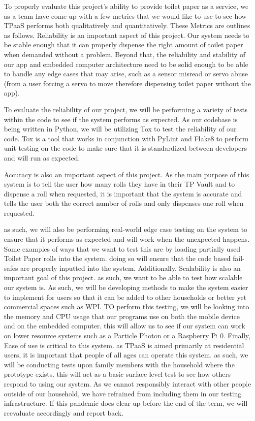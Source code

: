 To properly evaluate this project's ability to provide toilet paper as a service, we as a team have come up with a few metrics that we would like to use to see how TPaaS performs both qualitatively and quantitatively. These Metrics are outlines as follows.
Reliability is an important aspect of this project. Our system needs to be stable enough that it can properly dispense the right amount of toilet paper when demanded without a problem. Beyond that, the reliability and stability of our app and embedded computer architecture need to be solid enough to be able to handle any edge cases that may arise, such as a sensor misread or servo abuse (from a user forcing a servo to move therefore dispensing toilet paper without the app).

To evaluate the reliability of our project, we will be performing a variety of tests within the code to see if the system performs as expected. As our codebase is being written in Python\cite{python}, we will be utilizing Tox\cite{tox} to test the reliability of our code. Tox is a tool that works in conjunction with PyLint\cite{pylint} and Flake8\cite{flake8} to perform unit testing on the code to make sure that it is standardized between developers and will run as expected. 

Accuracy is also an important aspect of this project. As the main purpose of this system is to tell the user how many rolls they have in their TP Vault and to dispense a roll when requested, it is important that the system is accurate and tells the user both the correct number of rolls and only dispenses one roll when requested.

as such, we will also be performing real-world edge case testing on the system to ensure that it performs as expected and will work when the unexpected happens. Some examples of ways that we want to test this are by loading partially used Toilet Paper rolls into the system. doing so will ensure that the code based fail-safes are properly inputted into the system. 
Additionally, Scalability is also an important goal of this project. as such, we want to be able to test how scalable our system is. As such, we will be developing methods to make the system easier to implement for users so that it can be added to other households or better yet commercial spaces such as WPI. 
TO perform this testing, we will be looking into the memory and CPU usage that our programs use on both the mobile device and on the embedded computer. this will allow us to see if our system can work on lower resource systems such as a Particle Photon or a Raspberry Pi 0.
Finally, Ease of use is critical to this system. as TPaaS is aimed primarily at residential users, it is important that people of all ages can operate this system. as such, we will be conducting tests upon family members with the household where the prototype exists. this will act as a basic surface level test to see how others respond to using our system. As we cannot responsibly interact with other people outside of our household, we have refrained from including them in our testing infrastructure. If this pandemic does clear up before the end of the term, we will reevaluate accordingly and report back.